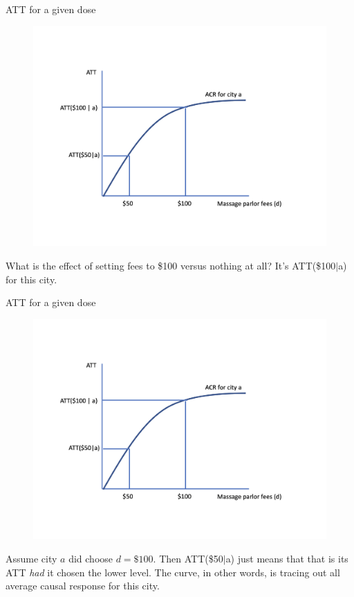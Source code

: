 \documentclass{beamer}
\begin{document}
\begin{frame}{ATT for a given dose}

\begin{figure}
\begin{center}
             \includegraphics[scale=0.3]{./lecture_includes/acrt_fig1.png}
\end{center}
\end{figure}

What is the effect of setting fees to \$100 versus nothing at all? It's ATT(\$100$|$a) for this city.


\end{frame}

\begin{frame}{ATT for a given dose}

\begin{figure}
\begin{center}
             \includegraphics[scale=0.3]{./lecture_includes/acrt_fig1.png}
\end{center}
\end{figure}

Assume city $a$ did choose $d=\$100$. Then ATT(\$50$|$a) just means that that is its ATT \emph{had} it chosen the lower level.  The curve, in other words, is tracing out all average causal response for this city.


\end{frame}
\end{document}
